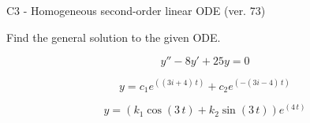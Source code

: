 \begin{exercise}
  \begin{exerciseTitle}C3 - Homogeneous second-order linear ODE (ver. 73)\end{exerciseTitle}
  \begin{exerciseStatement}
    
Find the general solution to the given ODE.

    
\[y''-8y'+25y = 0\]

  \end{exerciseStatement}
  \begin{exerciseAnswer}
    
\[y= c_{1} e^{\left(\left(3 i + 4\right) \, t\right)} + c_{2} e^{\left(-\left(3 i - 4\right) \, t\right)}\]

    
\[y= {\left(k_{1} \cos\left(3 \, t\right) + k_{2} \sin\left(3 \, t\right)\right)} e^{\left(4 \, t\right)}\]

  \end{exerciseAnswer}
\end{exercise}
